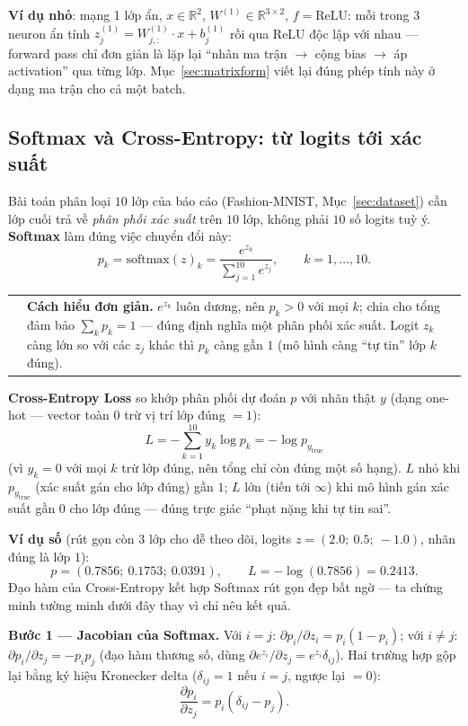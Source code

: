 \documentclass[12pt,a4paper]{article}
\makeatletter
\newenvironment{tructiep}[1][Cách hiểu đơn giản]
  {\par\smallskip\noindent\begin{tabular}{@{}p{0.35em}@{\hspace{6pt}}p{\dimexpr\linewidth-1.9em\relax}@{}}
   \textcolor{boxln}{\rule{2pt}{\baselineskip}} & \textbf{#1.}\enspace\ignorespaces}
  {\end{tabular}\par\smallskip}
\makeatother
\begin{document}
\textbf{Ví dụ nhỏ}: mạng 1 lớp ẩn, $x\in\mathbb R^2$,
$W^{(1)}\in\mathbb R^{3\times2}$, $f=\mathrm{ReLU}$: mỗi trong 3 neuron ẩn
tính $z^{(1)}_j = W^{(1)}_{j,:}\cdot x + b^{(1)}_j$ rồi qua ReLU độc lập
với nhau --- forward pass chỉ đơn giản là lặp lại ``nhân ma trận $\to$ cộng
bias $\to$ áp activation'' qua từng lớp. Mục~\ref{sec:matrixform} viết lại
đúng phép tính này ở dạng ma trận cho cả một batch.

\subsection{Softmax và Cross-Entropy: từ logits tới xác suất}
\label{sec:softmax}

Bài toán phân loại $10$ lớp của báo cáo (Fashion-MNIST, Mục~\ref{sec:dataset})
cần lớp cuối trả về \emph{phân phối xác suất} trên $10$ lớp, không phải
$10$ số logits tuỳ ý. \textbf{Softmax} làm đúng việc chuyển đổi này:
$$p_k = \mathrm{softmax}(z)_k = \frac{e^{z_k}}{\sum_{j=1}^{10} e^{z_j}}, \qquad k=1,\ldots,10.$$

\begin{tructiep}
$e^{z_k}$ luôn dương, nên $p_k>0$ với mọi $k$; chia cho tổng đảm bảo
$\sum_k p_k=1$ --- đúng định nghĩa một phân phối xác suất. Logit $z_k$
càng lớn so với các $z_j$ khác thì $p_k$ càng gần $1$ (mô hình càng ``tự
tin'' lớp $k$ đúng).
\end{tructiep}

\textbf{Cross-Entropy Loss} so khớp phân phối dự đoán $p$ với nhãn thật
$y$ (dạng one-hot --- vector toàn $0$ trừ vị trí lớp đúng $=1$):
$$L = -\sum_{k=1}^{10} y_k\log p_k = -\log p_{y_{\text{true}}}$$
(vì $y_k=0$ với mọi $k$ trừ lớp đúng, nên tổng chỉ còn đúng một số hạng).
$L$ nhỏ khi $p_{y_{\text{true}}}$ (xác suất gán cho lớp đúng) gần $1$; $L$
lớn (tiến tới $\infty$) khi mô hình gán xác suất gần $0$ cho lớp đúng ---
đúng trực giác ``phạt nặng khi tự tin sai''.

\textbf{Ví dụ số} (rút gọn còn $3$ lớp cho dễ theo dõi, logits
$z=(2.0;\ 0.5;\ -1.0)$, nhãn đúng là lớp $1$):
$$p = (0.7856;\ 0.1753;\ 0.0391), \qquad L=-\log(0.7856)=0.2413.$$
Đạo hàm của Cross-Entropy kết hợp Softmax rút gọn đẹp bất ngờ --- ta chứng
minh tường minh dưới đây thay vì chỉ nêu kết quả.

\textbf{Bước 1 --- Jacobian của Softmax.} Với $i=j$:
$\partial p_i/\partial z_i = p_i(1-p_i)$; với $i\ne j$:
$\partial p_i/\partial z_j = -p_ip_j$ (đạo hàm thương số, dùng
$\partial e^{z_i}/\partial z_j=e^{z_i}\delta_{ij}$). Hai trường hợp gộp
lại bằng ký hiệu Kronecker delta ($\delta_{ij}=1$ nếu $i=j$, ngược lại
$=0$):
$$\frac{\partial p_i}{\partial z_j} = p_i(\delta_{ij}-p_j).$$
\end{document}
